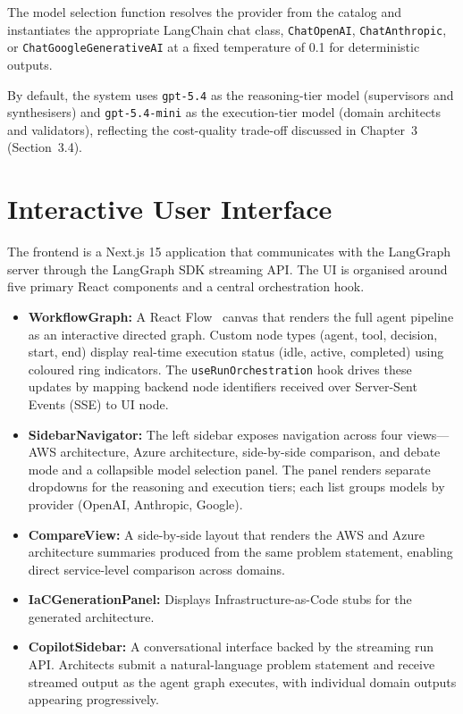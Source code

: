 The model selection function resolves the provider from the catalog and instantiates the appropriate LangChain chat class, \texttt{ChatOpenAI}, \texttt{ChatAnthropic}, or \texttt{ChatGoogleGenerativeAI} at a fixed temperature of 0.1 for deterministic outputs.

By default, the system uses \texttt{gpt-5.4} as the reasoning-tier model (supervisors and synthesisers) and \texttt{gpt-5.4-mini} as the execution-tier model (domain architects and validators), reflecting the cost-quality trade-off discussed in Chapter~3 (Section~3.4).

\section{Interactive User Interface}

The frontend is a Next.js 15 application that communicates with the LangGraph server through the LangGraph SDK streaming API. The UI is organised around five primary React components and a central orchestration hook.

\begin{itemize}
    \item \textbf{WorkflowGraph:} A React Flow~\cite{reactflow2024} canvas that renders the full agent pipeline as an interactive directed graph. Custom node types (agent, tool, decision, start, end) display real-time execution status (idle, active, completed) using coloured ring indicators. The \texttt{useRunOrchestration} hook drives these updates by mapping backend node identifiers received over Server-Sent Events (SSE) to UI node.
    \item \textbf{SidebarNavigator:} The left sidebar exposes navigation across four views---AWS architecture, Azure architecture, side-by-side comparison, and debate mode and a collapsible model selection panel. The panel renders separate dropdowns for the reasoning and execution tiers; each list groups models by provider (OpenAI, Anthropic, Google).
    \item \textbf{CompareView:} A side-by-side layout that renders the AWS and Azure architecture summaries produced from the same problem statement, enabling direct service-level comparison across domains.
    \item \textbf{IaCGenerationPanel:} Displays Infrastructure-as-Code stubs for the generated architecture.
    \item \textbf{CopilotSidebar:} A conversational interface backed by the streaming run API. Architects submit a natural-language problem statement and receive streamed output as the agent graph executes, with individual domain outputs appearing progressively.
\end{itemize}

